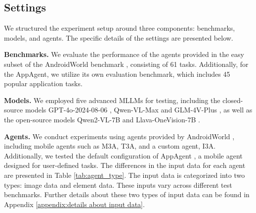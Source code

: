 \subsection{Settings}
\label{sec:evaluation_settings}

We structured the experiment setup around three components: benchmarks, models, and agents. The specific details of the settings are presented below.

\textbf{Benchmarks.} We evaluate the performance of the agents provided in the easy subset of the AndroidWorld benchmark \cite{rawles2024androidworld}, consisting of 61 tasks. Additionally, for the AppAgent, we utilize its own evaluation benchmark, which includes 45 popular application tasks. 

\textbf{Models.} We employed five advanced MLLMs for testing, including the closed-source models GPT-4o-2024-08-06 \citep{hurst2024gpt}, Qwen-VL-Max \citep{bai2023qwen} and GLM-4V-Plus \citep{hong2024cogvlm2}, as well as the open-source models Qwen2-VL-7B \citep{wang2024qwen2} and Llava-OneVision-7B \citep{li2024llava}.

\textbf{Agents.} We conduct experiments using agents provided by AndroidWorld \cite{rawles2024androidworld}, including mobile agents such as M3A, T3A, and a custom agent, I3A. Additionally, we tested the default configuration of AppAgent \citep{zhang2023appagentmultimodalagentssmartphone}, a mobile agent designed for user-defined tasks. The differences in the input data for each agent are presented in Table \ref{tab:agent_type}. The input data is categorized into two types: image data and element data. These inputs vary across different test benchmarks. Further details about these two types of input data can be found in Appendix \ref{appendix:details about input data}.

